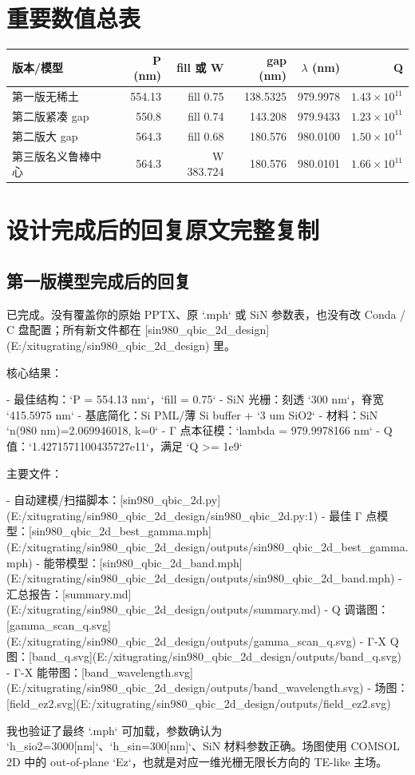 \documentclass[11pt,a4paper]{ctexart}
\begin{document}
\section{重要数值总表}
\begin{longtable}{>{\raggedright\arraybackslash}p{3.1cm}rrrrr}
\toprule
版本/模型 & P (nm) & fill 或 W & gap (nm) & $\lambda$ (nm) & Q \\
\midrule
第一版无稀土 & 554.13 & fill 0.75 & 138.5325 & 979.9978 & $1.43\times10^{11}$ \\
第二版紧凑 gap & 550.8 & fill 0.74 & 143.208 & 979.9433 & $1.23\times10^{11}$ \\
第二版大 gap & 564.3 & fill 0.68 & 180.576 & 980.0100 & $1.50\times10^{11}$ \\
第三版名义鲁棒中心 & 564.3 & W 383.724 & 180.576 & 980.0101 & $1.66\times10^{11}$ \\
\bottomrule
\end{longtable}

\section{设计完成后的回复原文完整复制}
\subsection{第一版模型完成后的回复}
\begin{ExactText}
已完成。没有覆盖你的原始 PPTX、原 `.mph` 或 SiN 参数表，也没有改 Conda / C 盘配置；所有新文件都在 [sin980_qbic_2d_design](E:/xitugrating/sin980_qbic_2d_design) 里。

核心结果：

- 最佳结构：`P = 554.13 nm`，`fill = 0.75`
- SiN 光栅：刻透 `300 nm`，脊宽 `415.5975 nm`
- 基底简化：Si PML/薄 Si buffer + `3 um SiO2`
- 材料：SiN `n(980 nm)=2.069946018, k=0`
- Γ 点本征模：`lambda = 979.9978166 nm`
- Q 值：`1.4271571100435727e11`，满足 `Q >= 1e9`

主要文件：

- 自动建模/扫描脚本：[sin980_qbic_2d.py](E:/xitugrating/sin980_qbic_2d_design/sin980_qbic_2d.py:1)
- 最佳 Γ 点模型：[sin980_qbic_2d_best_gamma.mph](E:/xitugrating/sin980_qbic_2d_design/outputs/sin980_qbic_2d_best_gamma.mph)
- 能带模型：[sin980_qbic_2d_band.mph](E:/xitugrating/sin980_qbic_2d_design/outputs/sin980_qbic_2d_band.mph)
- 汇总报告：[summary.md](E:/xitugrating/sin980_qbic_2d_design/outputs/summary.md)
- Q 调谐图：[gamma_scan_q.svg](E:/xitugrating/sin980_qbic_2d_design/outputs/gamma_scan_q.svg)
- Γ-X Q 图：[band_q.svg](E:/xitugrating/sin980_qbic_2d_design/outputs/band_q.svg)
- Γ-X 能带图：[band_wavelength.svg](E:/xitugrating/sin980_qbic_2d_design/outputs/band_wavelength.svg)
- 场图：[field_ez2.svg](E:/xitugrating/sin980_qbic_2d_design/outputs/field_ez2.svg)

我也验证了最终 `.mph` 可加载，参数确认为 `h_sio2=3000[nm]`、`h_sin=300[nm]`、SiN 材料参数正确。场图使用 COMSOL 2D 中的 out-of-plane `Ez`，也就是对应一维光栅无限长方向的 TE-like 主场。
\end{ExactText}
\end{document}
